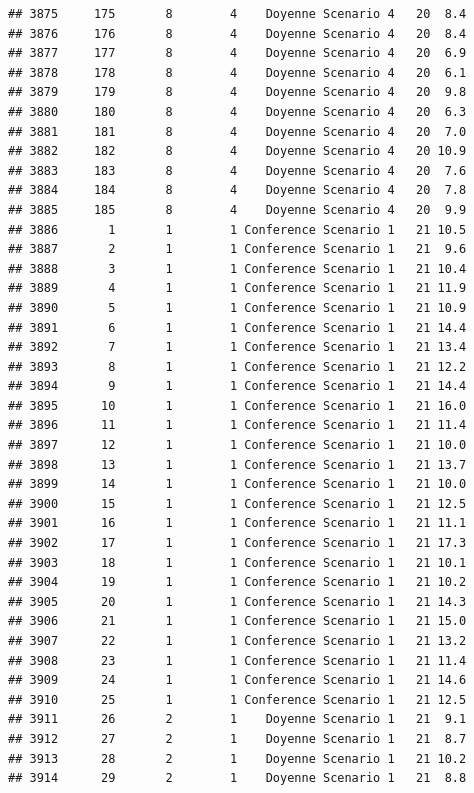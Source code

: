 \documentclass[
]{article}
\begin{document}
\begin{verbatim}
## 3875     175       8        4    Doyenne Scenario 4   20  8.4
## 3876     176       8        4    Doyenne Scenario 4   20  8.4
## 3877     177       8        4    Doyenne Scenario 4   20  6.9
## 3878     178       8        4    Doyenne Scenario 4   20  6.1
## 3879     179       8        4    Doyenne Scenario 4   20  9.8
## 3880     180       8        4    Doyenne Scenario 4   20  6.3
## 3881     181       8        4    Doyenne Scenario 4   20  7.0
## 3882     182       8        4    Doyenne Scenario 4   20 10.9
## 3883     183       8        4    Doyenne Scenario 4   20  7.6
## 3884     184       8        4    Doyenne Scenario 4   20  7.8
## 3885     185       8        4    Doyenne Scenario 4   20  9.9
## 3886       1       1        1 Conference Scenario 1   21 10.5
## 3887       2       1        1 Conference Scenario 1   21  9.6
## 3888       3       1        1 Conference Scenario 1   21 10.4
## 3889       4       1        1 Conference Scenario 1   21 11.9
## 3890       5       1        1 Conference Scenario 1   21 10.9
## 3891       6       1        1 Conference Scenario 1   21 14.4
## 3892       7       1        1 Conference Scenario 1   21 13.4
## 3893       8       1        1 Conference Scenario 1   21 12.2
## 3894       9       1        1 Conference Scenario 1   21 14.4
## 3895      10       1        1 Conference Scenario 1   21 16.0
## 3896      11       1        1 Conference Scenario 1   21 11.4
## 3897      12       1        1 Conference Scenario 1   21 10.0
## 3898      13       1        1 Conference Scenario 1   21 13.7
## 3899      14       1        1 Conference Scenario 1   21 10.0
## 3900      15       1        1 Conference Scenario 1   21 12.5
## 3901      16       1        1 Conference Scenario 1   21 11.1
## 3902      17       1        1 Conference Scenario 1   21 17.3
## 3903      18       1        1 Conference Scenario 1   21 10.1
## 3904      19       1        1 Conference Scenario 1   21 10.2
## 3905      20       1        1 Conference Scenario 1   21 14.3
## 3906      21       1        1 Conference Scenario 1   21 15.0
## 3907      22       1        1 Conference Scenario 1   21 13.2
## 3908      23       1        1 Conference Scenario 1   21 11.4
## 3909      24       1        1 Conference Scenario 1   21 14.6
## 3910      25       1        1 Conference Scenario 1   21 12.5
## 3911      26       2        1    Doyenne Scenario 1   21  9.1
## 3912      27       2        1    Doyenne Scenario 1   21  8.7
## 3913      28       2        1    Doyenne Scenario 1   21 10.2
## 3914      29       2        1    Doyenne Scenario 1   21  8.8

\end{verbatim}
\end{document}
